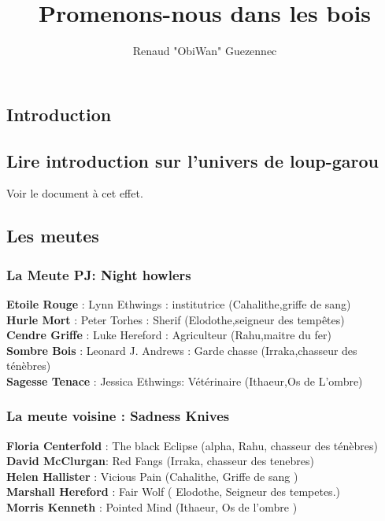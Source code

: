 \documentclass[oneside,12pt]{book}
\title{Promenons-nous dans les bois}
\author{Renaud "ObiWan" Guezennec}
\date{}
\newcommand{\Lynn}{\textbf{Etoile Rouge} }
\newcommand{\Jessica}{\textbf{Sagesse Tenace} }
\newcommand{\Luke}{\textbf{Cendre Griffe} }
\newcommand{\Peter}{\textbf{Hurle Mort} }
\newcommand{\Leonard}{\textbf{Sombre Bois} }
\begin{document}
\maketitle \clearpage
\tableofcontents \clearpage
\listoffigures \clearpage

\begin{flushleft}
    \chapter{Introduction}
        \section{Lire introduction sur l'univers de loup-garou}
       Voir le document à cet effet. 
         
\section{Les meutes}
\subsection{La Meute PJ: Night howlers}
\Lynn : Lynn Ethwings :  institutrice (Cahalithe,griffe de sang) \\
\Peter : Peter Torhes : Sherif (Elodothe,seigneur des tempêtes) \\
\Luke : Luke Hereford : Agriculteur (Rahu,maitre du fer)\\
\Leonard : Leonard J. Andrews : Garde chasse (Irraka,chasseur des ténèbres)\\
\Jessica : Jessica  Ethwings: Vétérinaire (Ithaeur,Os de L'ombre)\\

\subsection{La meute voisine : Sadness Knives}
\label{sadnessknives}
\textbf{Floria Centerfold} : The black Eclipse (alpha, Rahu, chasseur des ténèbres)\\
\textbf{David McClurgan}:  Red Fangs (Irraka, chasseur des tenebres)\\
\textbf{Helen Hallister} : Vicious Pain (Cahalithe, Griffe de sang )\\
\textbf{Marshall Hereford} : Fair Wolf ( Elodothe, Seigneur des tempetes.)\\
\textbf{Morris Kenneth} : Pointed Mind (Ithaeur, Os de l'ombre )\\


\end{flushleft}
\end{document}
